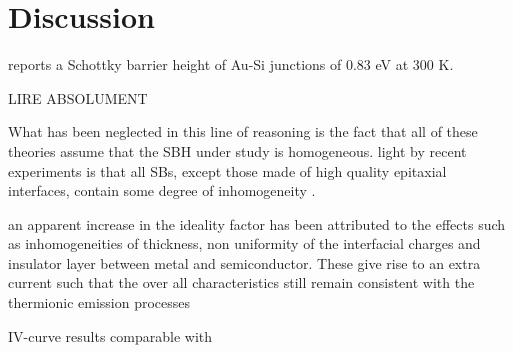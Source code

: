 \section{Discussion}
\cite{sze_physics_2007} reports a Schottky barrier height of Au-Si junctions of $0.83$ eV at 300 K.

LIRE ABSOLUMENT \Cite{maeda_temperature_2017}


What has been neglected in this line of reasoning is the fact that all of these theories assume that the SBH under study is homogeneous.
light by recent experiments is that all SBs, except those made of high quality epitaxial interfaces,
contain some degree of inhomogeneity \cite{tung_recent_2001}.

an apparent increase in
the ideality factor has been attributed to the effects
such as inhomogeneities of thickness, non uniformity of
the interfacial charges and insulator layer between
metal and semiconductor. These give rise to an extra
current such that the over all characteristics still
remain consistent with the thermionic emission
processes \cite{dhimmar_analysis_2016}

IV-curve results comparable with \cite{dhimmar_analysis_2016}